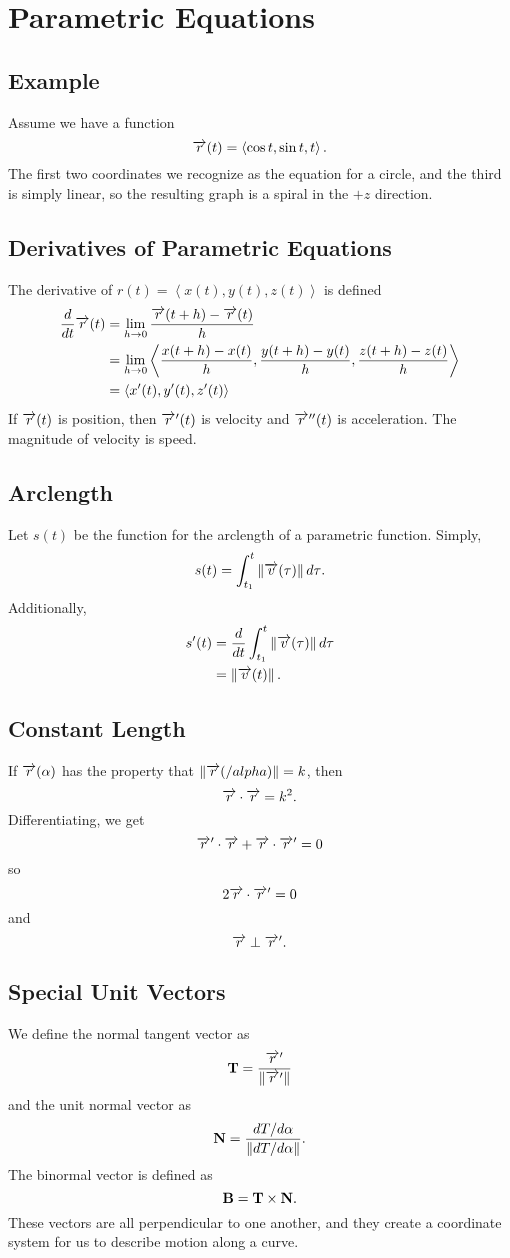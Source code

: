 \documentclass[12pt]{article}
\theoremstyle{plain} %
\theoremstyle{definition}
\theoremstyle{definition}
\theoremstyle{definition}
\theoremstyle{remark}
\newcommand{\vecv}{\vv{v}}
\newcommand{\vecr}{\vv{r}}
\newcommand{\angled}[1]{\left\langle {#1} \right\rangle}
\newcommand*{\vv}[1]{\overrightarrow{\mkern0mu#1}}
\renewcommand{\norm}[1]{\left\lVert#1\right\rVert}
\begin{document}
\section{Parametric Equations}
\subsection{Example}
Assume we have a function
\[ \vv{r}(t) = \angled{\cos{t},\sin{t},t}. \]
The first two coordinates we recognize as the equation for a circle, and the third is simply linear, so the resulting graph is a spiral in the $+z$ direction.
\subsection{Derivatives of Parametric Equations}
The derivative of $r(t) = \angled{x(t),y(t),z(t)}$ is defined
\begin{align*}
\frac{d}{dt} \vv{r}(t) &= \lim_{h \rightarrow 0} \frac{\vv{r}(t+h)-\vv{r}(t)}{h} \\
& = \lim_{h \rightarrow 0} \angled{\frac{x(t+h)-x(t)}{h},\frac{y(t+h)-y(t)}{h},\frac{z(t+h)-z(t)}{h}} \\
& = \angled{x^\prime(t),y^\prime(t),z^\prime(t)}
\end{align*}
If $\vecr(t)$ is position, then $\vecr^\prime(t)$ is velocity and $\vecr^{\prime\prime}(t)$ is acceleration. The magnitude of velocity is speed.

\subsection{Arclength}
Let $s(t)$ be the function for the arclength of a parametric function. Simply,
\[ s(t) = \int_{t_1}^t{\norm{\vecv(\tau)}d\tau}. \]
Additionally,
\begin{align*}
s^\prime(t) & = \frac{d}{dt} \int_{t_1}^t{\norm{\vecv(\tau)}d\tau} \\
& = \norm{\vecv(t)}.
\end{align*}

\subsection{Constant Length}
If $\vecr(\alpha)$ has the property that $\norm{\vecr(/alpha)} = k$, then
\[ \vecr \cdot \vecr = k^2.\]
Differentiating, we get
\[ \vecr^\prime \cdot \vecr + \vecr \cdot \vecr^\prime = 0 \]
so
\[ 2 \vecr \cdot \vecr^\prime = 0 \]
and
\[ \vecr \perp \vecr^\prime.\]

\subsection{Special Unit Vectors}
We define the normal tangent vector as \[\vb{T} = \frac{\vecr^\prime}{\norm{\vecr^\prime}}\] and the unit normal vector as \[\vb{N} = \frac{dT/d\alpha}{\norm{dT/d\alpha}}.\]
The binormal vector is defined as \[\vb{B} = \vb{T} \times \vb{N}. \]
These vectors are all perpendicular to one another, and they create a coordinate system for us to describe motion along a curve.
\end{document}
